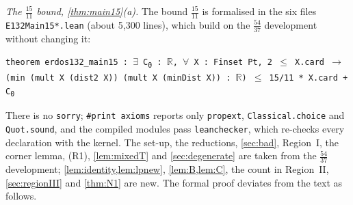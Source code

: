 \documentclass[11pt]{amsart}
\theoremstyle{definition}
\theoremstyle{remark}
\newcommand{\R}{\mathbb{R}}
\begin{document}
\emph{The $\frac{15}{11}$ bound, \cref{thm:main15}\textup{(a)}.} The bound $\frac{15}{11}$ is formalised in the six files \texttt{E132Main15*.lean} (about 5{,}300 lines), which build on the $\frac{54}{37}$ development without changing it:
\begin{center}
\texttt{theorem erdos132\_main15 : $\exists$ C\textsubscript{0} : $\R$, $\forall$ X : Finset Pt, 2 $\le$ X.card $\to$ (min (mult X (dist2 X)) (mult X (minDist X)) : $\R$) $\le$ 15/11 * X.card + C\textsubscript{0}}
\end{center}
There is no \texttt{sorry}; \texttt{\#print\allowbreak{} axioms} reports only \texttt{propext}, \texttt{Classical.choice} and \texttt{Quot.sound}, and the compiled modules pass \texttt{leanchecker}, which re-checks every declaration with the kernel. The set-up, the reductions, \cref{sec:bad}, Region~I, the corner lemma, (R1), \cref{lem:mixedT} and \cref{sec:degenerate} are taken from the $\frac{54}{37}$ development; \cref{lem:identity,lem:lpnew}, \cref{lem:B,lem:C}, the count in Region~II, \cref{sec:regionIII} and \cref{thm:N1} are new. The formal proof deviates from the text as follows.
\end{document}
